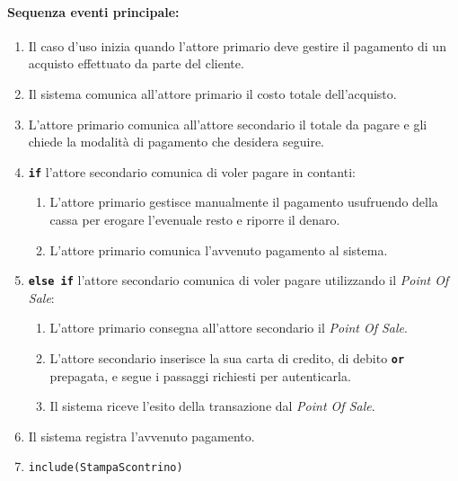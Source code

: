\documentclass{article}
\begin{document}
	\paragraph{Sequenza eventi principale:}
\begin{enumerate}[itemsep=8pt,parsep=0pt]

    \item Il caso d'uso inizia quando l'attore primario deve gestire il pagamento di un acquisto effettuato da parte del cliente.

	\item Il sistema comunica all'attore primario il costo totale dell'acquisto.

	\item L'attore primario comunica all'attore secondario il totale da pagare e gli chiede la modalità di pagamento che desidera seguire.

	\item \texttt{\textbf{if}} l'attore secondario comunica di voler pagare in contanti:
		\begin{enumerate}[leftmargin=28pt]
			\item L'attore primario gestisce manualmente il pagamento usufruendo della cassa per erogare l'evenuale resto e riporre il denaro.
			\item L'attore primario comunica l'avvenuto pagamento al sistema.
		\end{enumerate}
	\item \texttt{\textbf{else if}} l'attore secondario comunica di voler pagare utilizzando il \emph{Point Of Sale}:
		\begin{enumerate}[leftmargin=28pt]
			\item L'attore primario consegna all'attore secondario il \emph{Point Of Sale}.
			\item L'attore secondario inserisce la sua carta di credito, di debito 	\texttt{\textbf{or}} prepagata, e segue i passaggi richiesti per autenticarla.
			\item Il sistema riceve l'esito della transazione dal \emph{Point Of Sale}.
		\end{enumerate}

		\item Il sistema registra l'avvenuto pagamento.
    \item \texttt{include(StampaScontrino)}
    
\end{enumerate}
    
\end{document}
